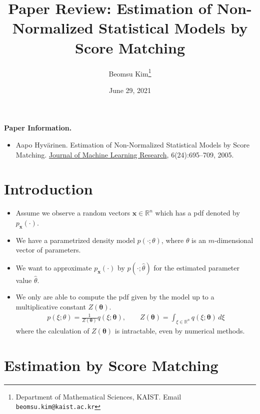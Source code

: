 \documentclass[10pt]{article}
\title{Paper Review: Estimation of Non-Normalized Statistical Models by Score Matching}
\author{Beomsu Kim\footnote{Department of Mathematical Sciences, KAIST. Email \texttt{beomsu.kim@kaist.ac.kr}}}
\date{June 29, 2021}
\newcommand{\RR}{\mathbb{R}}
\begin{document}
\maketitle

\textbf{Paper Information.}

\begin{itemize}
\item Aapo Hyv\"{a}rinen. Estimation of Non-Normalized Statistical Models by Score Matching. \newline \underline{Journal of Machine Learning Research}, 6(24):695--709, 2005.
\end{itemize}

\section{Introduction}

\begin{itemize}
\item Assume we observe a random vectors $\mathbf{x} \in \RR^n$ which has a pdf denoted by $p_\mathbf{x}(\cdot)$.
\item We have a parametrized density model $p(\cdot;\theta)$, where $\theta$ is an $m$-dimensional vector of parameters.
\item We want to approximate $p_\mathbf{x}(\cdot)$ by $p(\cdot;\hat{\theta})$ for the estimated parameter value $\hat{\theta}$.
\item We only are able to compute the pdf given by the model up to a multiplicative constant $Z(\bm{\theta})$.
\begin{align*}
p(\xi;\theta) = \frac{1}{Z(\bm{\theta})} q(\xi;\bm{\theta}), \qquad Z(\bm{\theta}) = \int_{\xi \in \RR^n} q(\xi;\bm{\theta}) \, d\xi
\end{align*}
where the calculation of $Z(\bm{\theta})$ is intractable, even by numerical methods.
\end{itemize}

\newpage

\section{Estimation by Score Matching}
\end{document}
